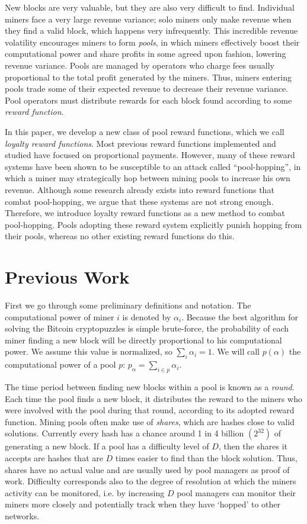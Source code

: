 \documentclass{article}
\theoremstyle{plain}
\theoremstyle{definition}
\begin{document}
New blocks are very valuable, but they are also very difficult to find. Individual miners face a very large revenue variance; solo miners only make revenue when they find a valid block, which happens very infrequently. This incredible revenue volatility encourages miners to form \emph{pools}, in which miners effectively boost their computational power and share profits in some agreed upon fashion, lowering revenue variance. Pools are managed by operators who charge fees usually proportional to the total profit generated by the miners. Thus, miners entering pools trade some of their expected revenue to decrease their revenue variance. Pool operators must distribute rewards for each block found according to some \emph{reward function}.

In this paper, we develop a new class of pool reward functions, which we call \emph{loyalty reward functions}. Most previous reward functions implemented and studied have focused on proportional payments\cite{Rosefeld2011}\cite{tim}. However, many of these reward systems have been shown to be susceptible to an attack called ``pool-hopping''\cite{Rosefeld2011}, in which a miner may strategically hop between mining pools to increase his own revenue. Although some research already exists into reward functions that combat pool-hopping, we argue that these systems are not strong enough. Therefore, we introduce loyalty reward functions as a new method to combat pool-hopping. Pools adopting these reward system explicitly punish hopping from their pools, whereas no other existing reward functions do this.

\section{Previous Work}
First we go through some preliminary definitions and notation. The computational power of miner $i$ is denoted by $\alpha_i$. Because the best algorithm for solving the Bitcoin cryptopuzzles is simple brute-force, the probability of each miner finding a new block will be directly proportional to his computational power. We assume this value is normalized, so $\sum_{i} \alpha_i = 1$. We will call $p({\alpha})$ the computational power of a pool $p$: $p_\alpha = \sum_{i\in p} \alpha_i$.

The time period between finding new blocks within a pool is known as a \emph{round}. Each time the pool finds a new block, it distributes the reward to the miners who were involved with the pool during that round, according to its adopted reward function. Mining pools often make use of \emph{shares}, which are hashes close to valid solutions. Currently every hash has a chance around 1 in 4 billion $(2^{32})$ of generating a new block. If a pool has a difficulty level of $D$, then the shares it accepts are hashes that are $D$ times easier to find than the block solution. Thus, shares have no actual value and are usually used by pool managers as proof of work. Difficulty corresponds also to the degree of resolution at which the miners activity can be monitored, i.e. by increasing $D$ pool managers can monitor their miners more closely and potentially track when they have `hopped' to other networks. 
\end{document}
